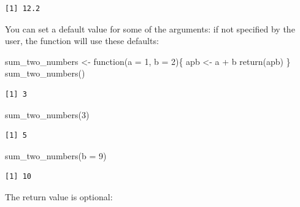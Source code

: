 \documentclass[
  letterpaper,
  DIV=11,
  numbers=noendperiod]{scrreprt}
\newenvironment{Shaded}{\begin{snugshade}}{\end{snugshade}}
\newcommand{\AttributeTok}[1]{\textcolor[rgb]{0.40,0.45,0.13}{#1}}
\newcommand{\ControlFlowTok}[1]{\textcolor[rgb]{0.00,0.23,0.31}{#1}}
\newcommand{\DecValTok}[1]{\textcolor[rgb]{0.68,0.00,0.00}{#1}}
\newcommand{\FunctionTok}[1]{\textcolor[rgb]{0.28,0.35,0.67}{#1}}
\newcommand{\NormalTok}[1]{\textcolor[rgb]{0.00,0.23,0.31}{#1}}
\newcommand{\OtherTok}[1]{\textcolor[rgb]{0.00,0.23,0.31}{#1}}
\newcommand{\SpecialCharTok}[1]{\textcolor[rgb]{0.37,0.37,0.37}{#1}}
\begin{document}
\begin{verbatim}
[1] 12.2
\end{verbatim}

You can set a default value for some of the arguments: if not specified
by the user, the function will use these defaults:

\begin{Shaded}
\begin{Highlighting}[]
\NormalTok{sum\_two\_numbers }\OtherTok{\textless{}{-}} \ControlFlowTok{function}\NormalTok{(}\AttributeTok{a =} \DecValTok{1}\NormalTok{, }\AttributeTok{b =} \DecValTok{2}\NormalTok{)\{}
\NormalTok{  apb }\OtherTok{\textless{}{-}}\NormalTok{ a }\SpecialCharTok{+}\NormalTok{ b  }
  \FunctionTok{return}\NormalTok{(apb)}
\NormalTok{\}}
\FunctionTok{sum\_two\_numbers}\NormalTok{()}
\end{Highlighting}
\end{Shaded}

\begin{verbatim}
[1] 3
\end{verbatim}

\begin{Shaded}
\begin{Highlighting}[]
\FunctionTok{sum\_two\_numbers}\NormalTok{(}\DecValTok{3}\NormalTok{)}
\end{Highlighting}
\end{Shaded}

\begin{verbatim}
[1] 5
\end{verbatim}

\begin{Shaded}
\begin{Highlighting}[]
\FunctionTok{sum\_two\_numbers}\NormalTok{(}\AttributeTok{b =} \DecValTok{9}\NormalTok{)}
\end{Highlighting}
\end{Shaded}

\begin{verbatim}
[1] 10
\end{verbatim}

The return value is optional:
\end{document}
